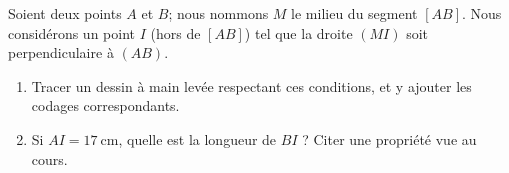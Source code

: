 
\begin{exercice}\label{exo2smath-0082}

    Soient deux points \( A\) et \( B\); nous nommons \( M\) le milieu du segment \( [AB]\). Nous considérons un point \( I\) (hors de \( [AB]\)) tel que la droite \( (MI)\) soit perpendiculaire à \( (AB)\).

    \begin{enumerate}
        \item
            Tracer un dessin à main levée respectant ces conditions, et y ajouter les codages correspondants.
        \item       
            Si \( AI=\SI{17}{\centi\meter}\), quelle est la longueur de \( BI\) ? Citer une propriété vue au cours.
    \end{enumerate}

\end{exercice}
